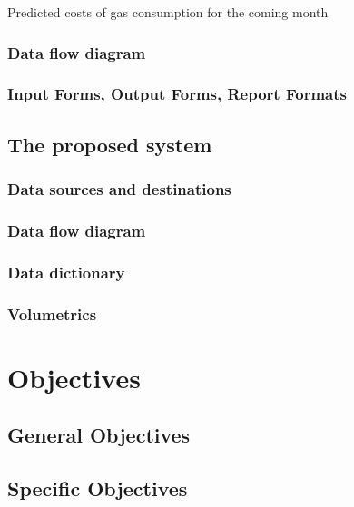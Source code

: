 \begin{algorithm}[H]
	\caption{Predicted costs of gas consumption for the coming month}
\begin{algorithmic}[H]

\subsubsection{Data flow diagram}

\subsubsection{Input Forms, Output Forms, Report Formats}

\subsection{The proposed system}

\subsubsection{Data sources and destinations}

\subsubsection{Data flow diagram}

\subsubsection{Data dictionary}

\subsubsection{Volumetrics}

\section{Objectives}

\subsection{General Objectives}

\subsection{Specific Objectives}


\end{algorithmic}
\end{algorithm}
